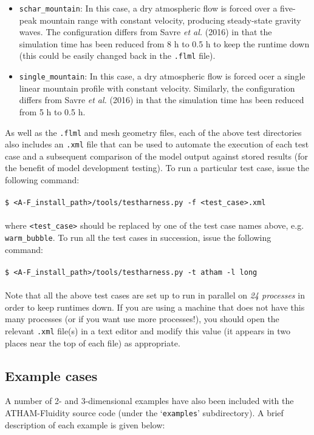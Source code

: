 \documentclass[10pt,a4paper]{article}
\newcommand\tab[1][0.5cm]{\hspace*{#1}}
\begin{document}
\begin{itemize}
\item \texttt{schar\_mountain}: In this case, a dry atmospheric flow is forced over a five-peak mountain range with constant velocity, producing steady-state gravity waves. The configuration differs from Savre \textit{et al.} (2016) in that the simulation time has been reduced from 8 h to 0.5 h to keep the runtime down (this could be easily changed back in the \texttt{.flml} file).
\item \texttt{single\_mountain}: In this case, a dry atmospheric flow is forced ocer a single linear mountain profile with constant velocity. Similarly, the configuration differs from Savre \textit{et al.} (2016) in that the simulation time has been reduced from 5 h to 0.5 h.
\end{itemize}
As well as the \texttt{.flml} and mesh geometry files, each of the above test directories also includes an \texttt{.xml} file that can be used to automate the execution of each test case and a subsequent comparison of the model output against stored results (for the benefit of model development testing). To run a particular test case, issue the following command:\\\\
\tab \texttt{\$ <A-F\_install\_path>/tools/testharness.py -f <test\_case>.xml}\\\\
where \texttt{<test\_case>} should be replaced by one of the test case names above, e.g. \texttt{warm\_bubble}. To run all the test cases in succession, issue the following command:\\\\
\tab \texttt{\$ <A-F\_install\_path>/tools/testharness.py -t atham -l long}\\\\
Note that all the above test cases are set up to run in parallel on \textit{24 processes} in order to keep runtimes down. If you are using a machine that does not have this many processes (or if you want use more processes!), you should open the relevant \texttt{.xml} file(s) in a text editor and modify this value (it appears in two places near the top of each file) as appropriate.

\subsection{Example cases}
A number of 2- and 3-dimensional examples have also been included with the ATHAM-Fluidity source code (under the `\texttt{examples}' subdirectory). A brief description of each example is given below:
\end{document}
